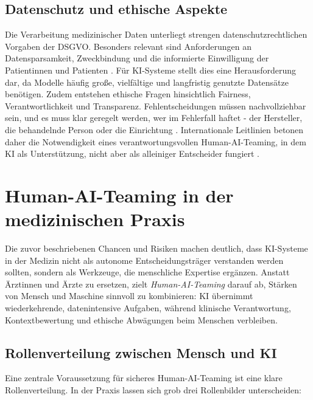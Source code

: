 \documentclass[lettersize,journal]{IEEEtran}
\begin{document}
	\subsection{Datenschutz und ethische Aspekte}

	Die Verarbeitung medizinischer Daten unterliegt strengen datenschutzrechtlichen Vorgaben der DSGVO. Besonders relevant sind Anforderungen an Datensparsamkeit, Zweckbindung und die informierte Einwilligung der Patientinnen und Patienten \cite{ref:dsgvo2018}. Für KI-Systeme stellt dies eine Herausforderung dar, da Modelle häufig große, vielfältige und langfristig genutzte Datensätze benötigen. Zudem entstehen ethische Fragen hinsichtlich Fairness, Verantwortlichkeit und Transparenz. Fehlentscheidungen müssen nachvollziehbar sein, und es muss klar geregelt werden, wer im Fehlerfall haftet - der Hersteller, die behandelnde Person oder die Einrichtung \cite{ref:floridi2022ethics}. Internationale Leitlinien betonen daher die Notwendigkeit eines verantwortungsvollen Human-AI-Teaming, in dem KI als Unterstützung, nicht aber als alleiniger Entscheider fungiert \cite{ref:whoai2021}.
	
	
	

	\section{Human-AI-Teaming in der medizinischen Praxis}

	\label{sec:human_ai_teaming}
	
	Die zuvor beschriebenen Chancen und Risiken machen deutlich, dass KI-Systeme in der Medizin nicht als autonome Entscheidungsträger verstanden werden sollten, sondern als Werkzeuge, die menschliche Expertise ergänzen. Anstatt Ärztinnen und Ärzte zu ersetzen, zielt \emph{Human-AI-Teaming} darauf ab, Stärken von Mensch und Maschine sinnvoll zu kombinieren: KI übernimmt wiederkehrende, datenintensive Aufgaben, während klinische Verantwortung, Kontextbewertung und ethische Abwägungen beim Menschen verbleiben\cite{ref:hai2025aiindex}\cite{ref:faiyazuddin2025}.
	
	
	\subsection{Rollenverteilung zwischen Mensch und KI}

	\label{subsec:rollenverteilung}
	
	Eine zentrale Voraussetzung für sicheres Human-AI-Teaming ist eine klare Rollenverteilung. In der Praxis lassen sich grob drei Rollenbilder unterscheiden:
	
\end{document}
